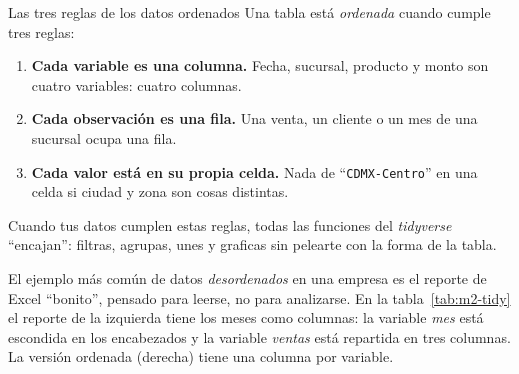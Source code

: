 \begin{concepto}{Las tres reglas de los datos ordenados}
Una tabla está \emph{ordenada} cuando cumple tres reglas:
\begin{enumerate}
  \item \textbf{Cada variable es una columna.} Fecha, sucursal, producto y
        monto son cuatro variables: cuatro columnas.
  \item \textbf{Cada observación es una fila.} Una venta, un cliente o un
        mes de una sucursal ocupa una fila.
  \item \textbf{Cada valor está en su propia celda.} Nada de
        ``\texttt{CDMX-Centro}'' en una celda si ciudad y zona son cosas
        distintas.
\end{enumerate}
Cuando tus datos cumplen estas reglas, todas las funciones del
\emph{tidyverse} ``encajan'': filtras, agrupas, unes y graficas sin pelearte
con la forma de la tabla.
\end{concepto}

El ejemplo más común de datos \emph{desordenados} en una empresa es el reporte
de Excel ``bonito'', pensado para leerse, no para analizarse. En la
tabla~\ref{tab:m2-tidy} el reporte de la izquierda tiene los meses como
columnas: la variable \emph{mes} está escondida en los encabezados y la
variable \emph{ventas} está repartida en tres columnas. La versión ordenada
(derecha) tiene una columna por variable.

